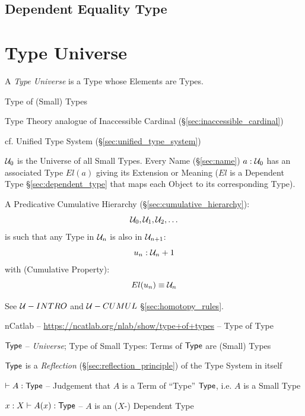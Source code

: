 \subsection{Dependent Equality Type}\label{sec:dependent_equality}



\section{Type Universe}\label{sec:type_universe}

A \emph{Type Universe} is a Type whose Elements are Types.

Type of (Small) Types

Type Theory analogue of Inaccessible Cardinal
(\S\ref{sec:inaccessible_cardinal})

\fist cf. Unified Type System (\S\ref{sec:unified_type_system})

$\mathcal{U}_0$ is the Universe of all Small Types. Every Name
(\S\ref{sec:name}) $a:\mathcal{U}_0$ has an associated Type $El(a)$
giving its Extension or Meaning ($El$ is a Dependent Type
\S\ref{sec:dependent_type} that maps each Object to its corresponding
Type).

A Predicative Cumulative Hierarchy (\S\ref{sec:cumulative_hierarchy}):
\[
  \mathcal{U}_0, \mathcal{U}_1, \mathcal{U}_2, \ldots
\]
is such that any Type in $\mathcal{U}_n$ is also in
$\mathcal{U}_{n+1}$:
\[
  u_n:\mathcal{U}_n+1
\]
with (Cumulative Property):
\[
  El(u_n) \equiv \mathcal{U}_n
\]

\fist See $\mathcal{U}-INTRO$ and $\mathcal{U}-CUMUL$
\S\ref{sec:homotopy_rules}.

\asterism

nCatlab -- \url{https://ncatlab.org/nlab/show/type+of+types} -- Type of
Type

$\mathsf{Type}$ -- \emph{Universe}; Type of Small Types: Terms of $\mathsf{Type}$ are
(Small) Types

$\mathsf{Type}$ is a \emph{Reflection} (\S\ref{sec:reflection_principle}) of
the Type System in itself

$\vdash A:\mathsf{Type}$ -- Judgement that $A$ is a Term of ``Type'' $\mathsf{Type}$,
i.e. $A$ is a Small Type

$x:X \vdash A(x):\mathsf{Type}$ -- $A$ is an ($X$-) Dependent Type

